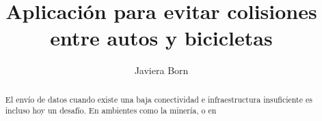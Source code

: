 \documentclass{article}
\title{Aplicación para evitar colisiones entre autos y bicicletas}
\author{Javiera Born}
\begin{document}
\begin{abstract}

El envío de datos cuando existe una baja conectividad e infraestructura insuficiente es incluso hoy un desafío. En ambientes como la minería, o en 

\end{abstract}
\end{document}
